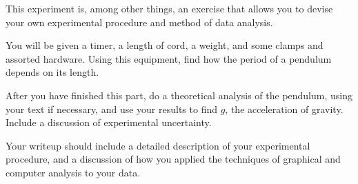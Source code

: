 \newexp

       This experiment is, among other things, an exercise that
 allows you to devise your own experimental procedure and method
 of data analysis.

       You will be given a timer, a length of cord, a weight, and
 some clamps and assorted hardware.  Using this equipment, find
 how the period of a pendulum depends on its length.

       After you have finished this part, do a theoretical
 analysis of the pendulum, using your text if necessary, and use
 your results to find $g$, the acceleration of gravity.  Include a
 discussion of experimental uncertainty.

       Your writeup should include a detailed description of your
 experimental procedure, and a discussion of how you applied the
 techniques of graphical and computer analysis to your data.

